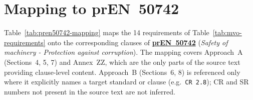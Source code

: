 \section{Mapping to prEN~50742}
\label{app:sec:mapping_pren50742}

Table~\ref{tab:pren50742-mapping} maps the 14 requirements of Table~\ref{tab:mvo-requirements} onto the corresponding clauses of \hyperref[subsec:pren_50742]{\textbf{prEN~50742}}  (\emph{Safety of machinery - Protection against corruption}). The mapping covers Approach~A (Sections~4, 5, 7) and Annex~ZZ, which are the only parts of the source text providing clause-level content. Approach~B (Sections~6, 8) is referenced only where it explicitly names a target standard or clause (e.g.\ \texttt{CR~2.8}); CR and SR numbers not present in the source text are not inferred.


